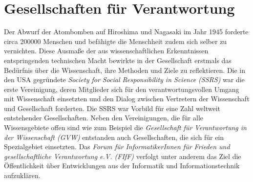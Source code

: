 \documentclass{pmwk}
\begin{document}
\section*{Gesellschaften für Verantwortung}
Der Abwurf der Atombomben auf Hiroshima und Nagasaki im Jahr 1945 forderte circa 200000 Menschen und befähigte die Menschheit zudem sich selber zu vernichten. Diese Ausmaße der aus wissenschaftlichen Erkenntnissen entspringenden technischen Macht bewirkte in der Gesellschaft erstmals das Bedürfnis über die Wissenschaft, ihre Methoden und Ziele zu reflektieren. Die in den USA gegründete \textit{Society for Social Responsibility in Science (SSRS)} war die erste Vereinigung, deren Mitglieder sich für den verantwortungsvollen Umgang mit Wissenschaft einsetzten und den Dialog zwischen Vertretern der Wissenschaft und Gesellschaft forderten. Die SSRS war Vorbild für eine Zahl weltweit entstehender Gesellschaften. Neben den Vereinigungen, die für alle Wissensgebiete offen sind wie zum Beispiel die \textit{Gesellschaft für Verantwortung in der Wissenschaft (GVW)} entstanden auch Gesellschaften,  die sich für ein Spezialgebiet einsetzten. Das \textit{Forum für InformatikerInnen für Frieden und gesellschaftliche Verantwortung e.V. (FIfF)} verfolgt unter anderem das Ziel die Öffentlichkeit über Entwicklungen aus der Informatik und Informationstechnik aufzuklären.



\end{document}
